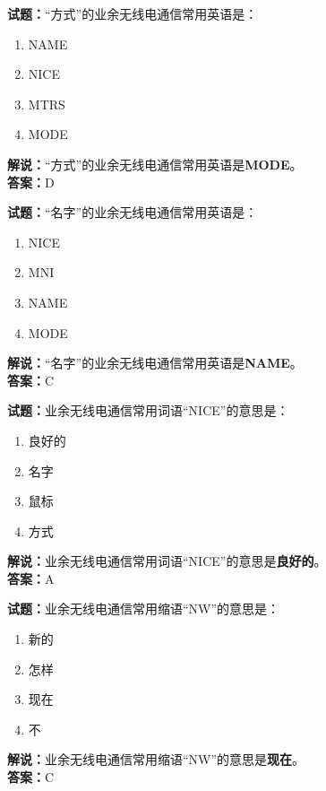\documentclass{ctexbook}
\begin{document}
\bigskip


\noindent\textbf{试题：}“方式”的业余无线电通信常用英语是：
\begin{enumerate}[leftmargin=3em]
\item NAME
\item NICE
\item MTRS
\item MODE
\end{enumerate}
\noindent\textbf{解说：}“方式”的业余无线电通信常用英语是\textbf{MODE}。\\\noindent\textbf{答案：}D



\bigskip


\noindent\textbf{试题：}“名字”的业余无线电通信常用英语是：
\begin{enumerate}[leftmargin=3em]
\item NICE
\item MNI
\item NAME
\item MODE
\end{enumerate}
\noindent\textbf{解说：}“名字”的业余无线电通信常用英语是\textbf{NAME}。\\\noindent\textbf{答案：}C



\bigskip


\noindent\textbf{试题：}业余无线电通信常用词语“NICE”的意思是：
\begin{enumerate}[leftmargin=3em]
\item 良好的
\item 名字
\item 鼠标
\item 方式
\end{enumerate}
\noindent\textbf{解说：}业余无线电通信常用词语“NICE”的意思是\textbf{良好的}。\\\noindent\textbf{答案：}A



\bigskip


\noindent\textbf{试题：}业余无线电通信常用缩语“NW”的意思是：
\begin{enumerate}[leftmargin=3em]
\item 新的
\item 怎样
\item 现在
\item 不
\end{enumerate}
\noindent\textbf{解说：}业余无线电通信常用缩语“NW”的意思是\textbf{现在}。\\\noindent\textbf{答案：}C
\end{document}
